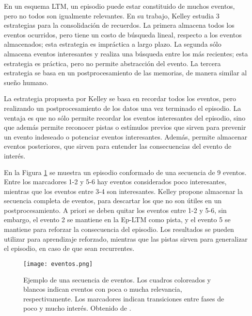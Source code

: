 
En un esquema LTM, un episodio puede estar constituido de muchos eventos, pero no todos son igualmente relevantes. En su trabajo, Kelley \cite{Kelley2014} estudia 3 estrategias para la consolidación de recuerdos. La primera almacena todos los eventos ocurridos, pero tiene un costo de búsqueda lineal, respecto a los eventos almacenados; esta estrategia es impráctica a largo plazo. La segunda sólo almacena eventos interesantes y realiza una búsqueda entre los más recientes; esta estrategia es práctica, pero no permite abstracción del evento. La tercera estrategia se basa en un postprocesamiento de las memorias, de manera similar al sueño humano.

La estrategia propuesta por Kelley se basa en recordar todos los eventos, pero realizando un postprocesamiento de los datos una vez terminado el episodio. La ventaja es que no sólo permite recordar los eventos interesantes del episodio, sino que además permite reconocer pistas o estímulos previos que sirven para prevenir un evento indeseado o potenciar eventos interesantes. Además, permite almacenar eventos posteriores, que sirven para entender las consecuencias del evento de interés. 

En la Figura \ref{img:sleep_eventos} se muestra un episodio conformado de una secuencia de 9 eventos. Entre los marcadores 1-2 y 5-6 hay eventos considerados poco interesantes, mientras que los eventos entre 3-4 son interesantes. Kelley propone almacenar la secuencia completa de eventos, para descartar los que no son útiles en un postprocesamiento. A priori se deben quitar los eventos entre 1-2 y 5-6, sin embargo, el evento 2 se mantiene en la Ep-LTM como pista, y el evento 5 se mantiene para reforzar la consecuencia del episodio. Los resultados se pueden utilizar para aprendizaje reforzado, mientras que las pistas sirven para generalizar el episodio, en caso de que sean recurrentes.

\begin{figure}[!h]
	\centering
	\texttt{[image: eventos.png]}
	\caption{\small Ejemplo de una secuencia de eventos. Los cuadros coloreados y blancos indican eventos con poca o mucha relevancia, respectivamente. Los marcadores indican transiciones entre fases de poco y mucho interés. Obtenido de \cite{Kelley2014}.}
	\label{img:sleep_eventos}
\end{figure}


